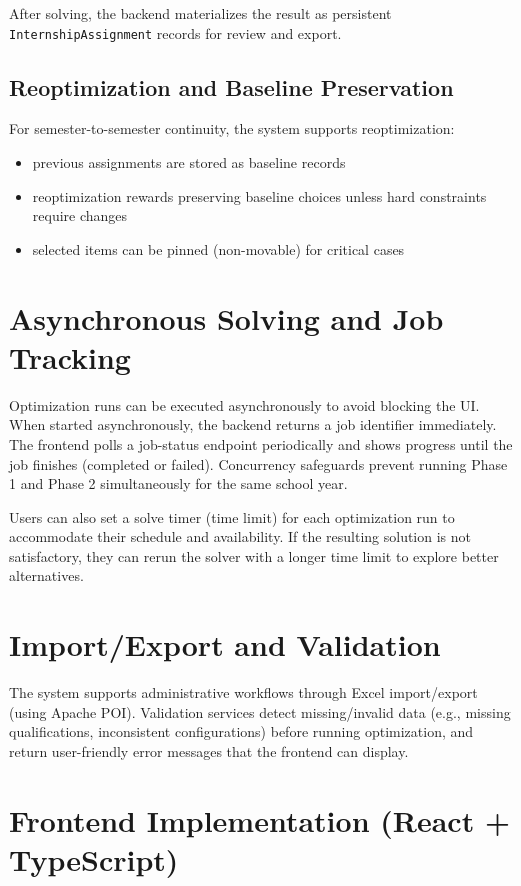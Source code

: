 \documentclass[12pt,a4paper]{report}
\begin{document}
After solving, the backend materializes the result as persistent \texttt{InternshipAssignment} records for review and export.

\subsection{Reoptimization and Baseline Preservation}

For semester-to-semester continuity, the system supports reoptimization:

\begin{itemize}
    \item previous assignments are stored as baseline records
    \item reoptimization rewards preserving baseline choices unless hard constraints require changes
    \item selected items can be pinned (non-movable) for critical cases
\end{itemize}

\section{Asynchronous Solving and Job Tracking}

Optimization runs can be executed asynchronously to avoid blocking the UI. When started asynchronously, the backend returns a job identifier immediately. The frontend polls a job-status endpoint periodically and shows progress until the job finishes (completed or failed). Concurrency safeguards prevent running Phase 1 and Phase 2 simultaneously for the same school year.

Users can also set a solve timer (time limit) for each optimization run to accommodate their schedule and availability. If the resulting solution is not satisfactory, they can rerun the solver with a longer time limit to explore better alternatives.

\section{Import/Export and Validation}

The system supports administrative workflows through Excel import/export (using Apache POI). Validation services detect missing/invalid data (e.g., missing qualifications, inconsistent configurations) before running optimization, and return user-friendly error messages that the frontend can display.

\section{Frontend Implementation (React + TypeScript)}
\end{document}
